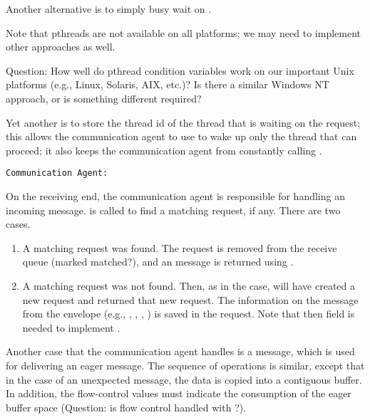 \begin{mmadi}
\begin{tcp}
\begin{enumerate}
Another alternative is to simply busy wait on .

Note that pthreads are not available on all platforms; we may need to
implement other approaches as well.

Question: How well do pthread condition variables work on our important Unix
platforms (e.g., Linux, Solaris, AIX, etc.)?  Is there a similar Windows NT
approach, or is something different required?

Yet another is to store the thread id of the thread that is waiting on the
request; this allows the communication agent to use 
to wake up only the thread that can proceed; it also keeps the communication
agent from constantly calling .
\end{enumerate}

\texttt{Communication Agent:}

On the receiving end, the communication agent is responsible for handling an
incoming  message.  
 is called to find a matching request, if
any.  There are two cases.
\begin{enumerate}
\item A matching request was found.  The request is removed from the receive
  queue (marked matched?), and an  message is
  returned using .
\item A matching request was not found.  Then, as in the 
  case,  will have created a new request and
  returned that new request.
  The information on the message from
  the envelope (e.g., ,
  ,
  ,
  ) is saved in the request.  Note
  that then  field is needed to
  implement . 
\end{enumerate}

Another case that the communication agent handles is a
 message, which is used for delivering an eager
message. 
The sequence of operations is similar, except that in the case of an
unexpected message, the data is copied into a contiguous buffer.  In addition,
the flow-control values must indicate the consumption of the eager buffer
space (Question: is flow control handled with ?).  


\end{tcp}
\end{mmadi}
